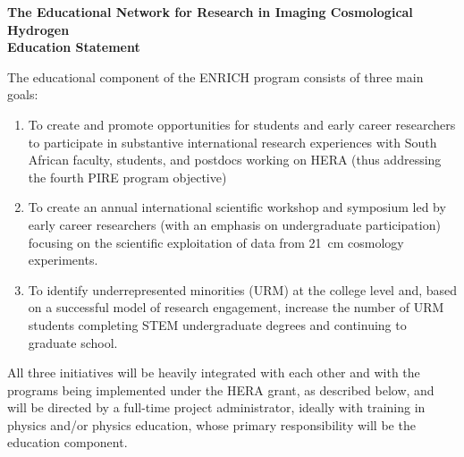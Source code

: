 \documentclass[preprint,11pt]{aastex}
\begin{document}
\clearpage
\setcounter{page}{1}

\setlength{\parindent}{0cm}
\textbf{\large The Educational Network for Research in Imaging Cosmological Hydrogen}\\
\textbf{Education Statement}
\vspace{6pt}
\setlength{\parindent}{17pt}

The educational component of the ENRICH program consists of three main goals:

\begin{enumerate}
\item To create and promote opportunities for students and early career researchers to participate in substantive international research experiences 
with South African faculty, students, and postdocs working on HERA (thus addressing the fourth PIRE program objective)

\item To create an annual international scientific workshop and symposium led by early career researchers (with an emphasis on undergraduate participation) focusing on the scientific exploitation of data from 21\, cm cosmology experiments.

\item To identify underrepresented minorities (URM) at the college level and, based on a successful model of research engagement, increase the number of URM students completing STEM undergraduate degrees and continuing to graduate school.
\end{enumerate}

All three initiatives will be heavily integrated with each other and with the programs being implemented under the HERA grant, as described below, and 
will be directed by a full-time project administrator, ideally with training in physics and/or physics education, whose primary responsibility will be the education component.  
\end{document}
